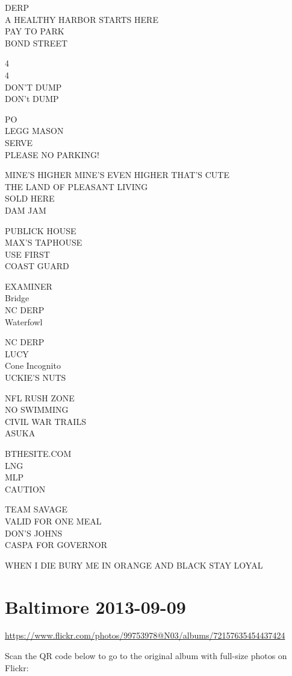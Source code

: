 \documentclass[10pt,letterpaper]{article}
\begin{document}
DERP\\
A HEALTHY HARBOR STARTS HERE\\
PAY TO PARK\\
BOND STREET

4\\
4\\
DON'T DUMP\\
DON't DUMP

PO\\
LEGG MASON\\
SERVE\\
PLEASE NO PARKING!

MINE'S HIGHER MINE'S EVEN HIGHER THAT'S CUTE\\
THE LAND OF PLEASANT LIVING\\
SOLD HERE\\
DAM JAM

PUBLICK HOUSE\\
MAX'S TAPHOUSE\\
USE FIRST\\
COAST GUARD

EXAMINER\\
Bridge\\
NC DERP\\
Waterfowl

NC DERP\\
LUCY\\
Cone Incognito\\
UCKIE'S NUTS

NFL RUSH ZONE\\
NO SWIMMING\\
CIVIL WAR TRAILS\\
ASUKA

BTHESITE.COM\\
LNG\\
MLP\\
CAUTION

TEAM SAVAGE\\
VALID FOR ONE MEAL\\
DON'S JOHNS\\
CASPA FOR GOVERNOR

WHEN I DIE BURY ME IN ORANGE AND BLACK STAY LOYAL


\section*{Baltimore 2013-09-09}

\url{https://www.flickr.com/photos/99753978@N03/albums/72157635454437424}

Scan the QR code below to go to the original album with full-size photos on Flickr:
\end{document}
